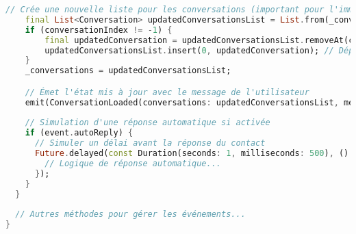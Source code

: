 \begin{lstlisting}[language=Dart, caption=Implémentation du ConversationBloc, style=dartstyle]
    // Crée une nouvelle liste pour les conversations (important pour l'immutabilité)
    final List<Conversation> updatedConversationsList = List.from(_conversations);
    if (conversationIndex != -1) { 
        final updatedConversation = updatedConversationsList.removeAt(conversationIndex);
        updatedConversationsList.insert(0, updatedConversation); // Déplace la conversation en haut
    }
    _conversations = updatedConversationsList;

    // Émet l'état mis à jour avec le message de l'utilisateur
    emit(ConversationLoaded(conversations: updatedConversationsList, messages: updatedMessages));
    
    // Simulation d'une réponse automatique si activée
    if (event.autoReply) {
      // Simuler un délai avant la réponse du contact
      Future.delayed(const Duration(seconds: 1, milliseconds: 500), () {
        // Logique de réponse automatique...
      });
    }
  }
  
  // Autres méthodes pour gérer les événements...
}
\end{lstlisting}
